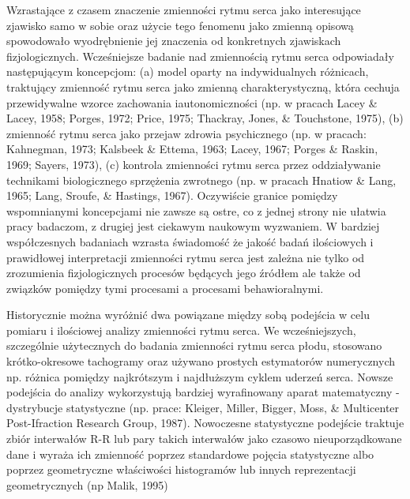 Wzrastające z czasem znaczenie zmienności rytmu serca jako interesujące zjawisko samo
w sobie oraz użycie tego fenomenu jako zmienną opisową spowodowało wyodrębnienie jej
znaczenia od konkretnych zjawiskach fizjologicznych. Wcześniejsze badanie nad zmiennością
rytmu serca odpowiadały następującym koncepcjom: (a) model oparty na indywidualnych
różnicach, traktujący zmienność rytmu serca jako zmienną charakterystyczną,
która cechuja przewidywalne wzorce zachowania iautonomiczności (np. w pracach Lacey \&
Lacey, 1958; Porges, 1972; Price, 1975; Thackray, Jones, \& Touchstone, 1975),
(b) zmienność rytmu serca jako przejaw zdrowia psychicznego (np. w pracach:
 Kahnegman, 1973; Kalsbeek \& Ettema, 1963; Lacey, 1967; Porges \& Raskin, 1969;
 Sayers, 1973), (c) kontrola zmienności rytmu serca przez oddziaływanie technikami
 biologicznego sprzężenia zwrotnego (np. w pracach Hnatiow \& Lang, 1965; Lang, Sroufe,
 \& Hastings, 1967). Oczywiście granice pomiędzy wspomnianymi koncepcjami nie zawsze są
 ostre, co z jednej strony nie ułatwia pracy badaczom, z drugiej jest ciekawym naukowym
wyzwaniem. W bardziej współczesnych badaniach wzrasta świadomość że jakość badań
ilościowych i prawidłowej interpretacji zmienności rytmu serca jest zależna nie tylko
od zrozumienia fizjologicznych procesów będących jego źródłem ale także od
związków pomiędzy tymi procesami a procesami behawioralnymi.

Historycznie można wyróżnić dwa powiązane między sobą podejścia w celu pomiaru i
ilościowej analizy zmienności rytmu serca. We wcześniejszych, szczególnie użytecznych
do badania zmienności rytmu serca płodu, stosowano krótko-okresowe tachogramy oraz
używano prostych estymatorów numerycznych np. różnica pomiędzy najkrótszym i
najdłuższym cyklem uderzeń serca. Nowsze podejścia do analizy wykorzystują bardziej
wyrafinowany aparat matematyczny - dystrybucje statystyczne (np. prace: Kleiger, Miller,
Bigger, Moss, \& Multicenter Post-Ifraction Research Group, 1987). Nowoczesne statystyczne
podejście traktuje zbiór interwałów R-R lub pary takich interwałów jako czasowo
nieuporządkowane dane i wyraża ich zmienność poprzez standardowe pojęcia statystyczne
albo poprzez geometryczne właściwości histogramów lub innych reprezentacji
geometrycznych (np Malik, 1995)

